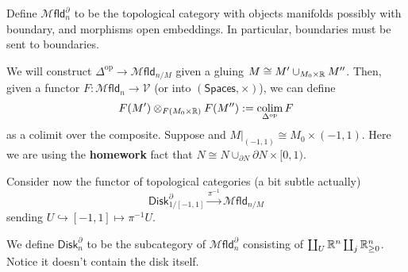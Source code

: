 \documentclass{amsart}
\newcommand{\mfld}{\mathscr{M}\mathsf{fld}_n}
\newcommand{\mfldm}{\mathscr{M}\mathsf{fld}_{n/M}}
\newcommand{\mfldd}{\mathscr{M}\mathsf{fld}_n^\partial}
\begin{document}
\begin{definition}
    Define $\mfldd$ to be the topological category with objects manifolds possibly with
    boundary, and morphisms open embeddings. In particular, boundaries must be sent to
    boundaries.
\end{definition}

We will construct $\Delta^\text{op}\to \mfldm$ given a gluing $M\cong M'\cup_{M_0\times\mathbb{R}}M''$.
Then, given a functor $F:\mfld\to \mathcal{V}$ (or into $(\mathsf{Spaces},\times)$), we
can define
\begin{equation*}
    F(M')\otimes_{F(M_0\times\mathbb{R})}F(M'') := \operatorname*{colim}_{\Delta^\text{op}} F
\end{equation*}
as a colimit over the composite. Suppose
and $M|_{(-1,1)}\cong M_0\times(-1,1)$.
Here we are using the \textbf{homework} fact that $N\cong N\cup_{\partial N}\partial N\times [0,1)$.


Consider now the functor of topological categories (a bit subtle actually)
\begin{equation*}
    \mathsf{Disk}_{1/[-1,1]}^\partial \xrightarrow{\pi^{-1}} \mfldm
\end{equation*}
sending $U\hookrightarrow[-1,1]\mapsto \pi^{-1}U$.

\begin{definition}
    We define $\mathsf{Disk}_n^\partial$ to be the subcategory of $\mfldd$ consisting
    of $\coprod_U \mathbb{R}^n\coprod_j \mathbb{R}^n_{\geq 0}$. Notice it doesn't contain the disk itself.
\end{definition}
\end{document}
